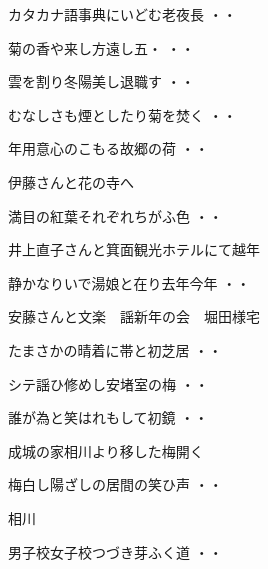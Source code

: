 \begin{shiika}カタカナ語事典にいどむ老夜長
\hfill{・・}\end{shiika}
\begin{shiika}菊の香や来し方遠し五・
\hfill{・・}\end{shiika}
\begin{shiika}雲を割り冬陽美し退職す
\hfill{・・}\end{shiika}
\begin{shiika}むなしさも煙としたり菊を焚く
\hfill{・・}\end{shiika}
\begin{shiika}年用意心のこもる故郷の荷
\hfill{・・}\end{shiika}
\vspace{0.6cm}
伊藤さんと花の寺へ
\begin{shiika}満目の紅葉それぞれちがふ色
\hfill{・・}\end{shiika}
\vspace{0.6cm}
井上直子さんと箕面観光ホテルにて越年
\begin{shiika}静かなりいで湯娘と在り去年今年
\hfill{・・}\end{shiika}
\vspace{0.6cm}
安藤さんと文楽　謡新年の会　堀田様宅
\begin{shiika}たまさかの晴着に帯と初芝居
\hfill{・・}\end{shiika}
\begin{shiika}シテ謡ひ修めし安堵室の梅
\hfill{・・}\end{shiika}
\begin{shiika}誰が為と笑はれもして初鏡
\hfill{・・}\end{shiika}
\vspace{0.6cm}
成城の家相川より移した梅開く
\begin{shiika}梅白し陽ざしの居間の笑ひ声
\hfill{・・}\end{shiika}
\vspace{0.6cm}
相川
\begin{shiika}男子校女子校つづき芽ふく道
\hfill{・・}\end{shiika}
\vspace{0.6cm}
